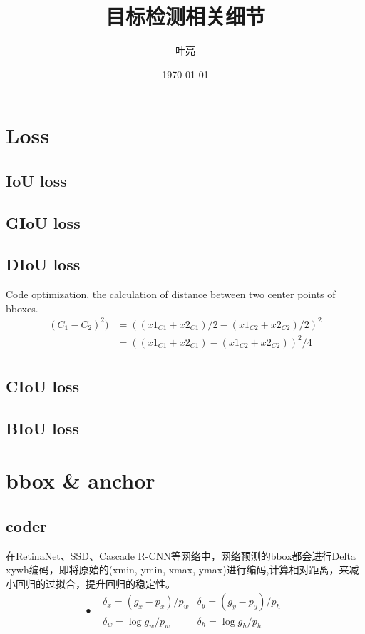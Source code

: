 \documentclass{article}
\title{目标检测相关细节}
\author{叶亮}
\date{\today}
\begin{document}
 
\maketitle
\section{Loss}
\subsection{IoU loss}


\subsection{GIoU loss}

\subsection{DIoU loss}

Code optimization, the calculation of distance between two center points of bboxes.
\begin{equation}
\begin{aligned}
(C_1-C_2)^2)&= ((x1_{C1}+x2_{C1})/2-(x1_{C2}+x2_{C2})/2)^2 \\
&=((x1_{C1}+x2_{C1})-(x1_{C2}+x2_{C2}))^2/4 \\
\end{aligned}
\end{equation}
\subsection{CIoU loss}
\subsection{BIoU loss}

\section{bbox \& anchor}

\subsection{coder}
在RetinaNet、SSD、Cascade R-CNN等网络中，网络预测的bbox都会进行Delta xywh编码，即将原始的(xmin, ymin, xmax, ymax)进行编码,计算相对距离，来减小回归的过拟合，提升回归的稳定性。
\begin{equation}\textbf{•}
\begin{aligned}
&\delta_x = (g_x-p_x)/p_w	   & \delta_y = (g_y - p_y)/p_h \\
&\delta_w = \log{g_w/p_w}	&\delta_h = \log{g_h/p_h}
\end{aligned}\label{bbox_coder}
\end{equation}
\end{document}
